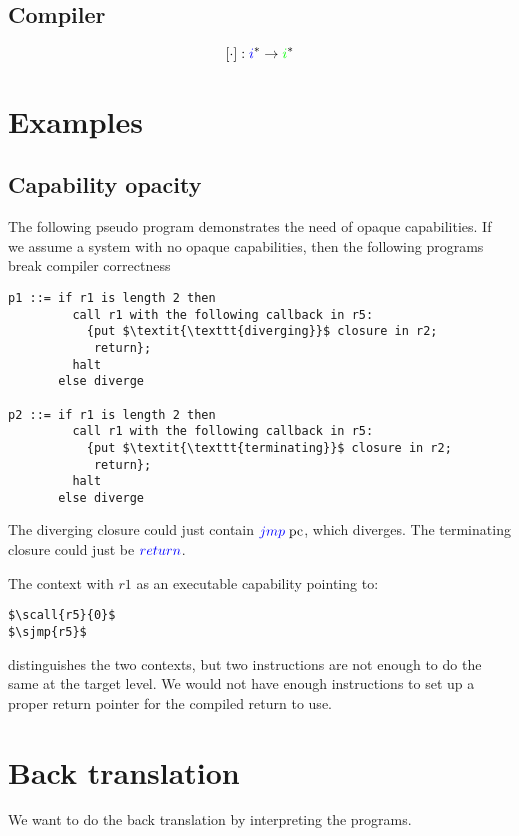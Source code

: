 \documentclass[a4paper]{article}
\newcommand{\fun}{\rightarrow}
\newcommand{\sourcecolor}[1]{\color{blue}}
\newcommand{\src}[1]{{\sourcecolor{} #1}}
\newcommand{\targetcolor}[1]{\color{green}}
\newcommand{\trg}[1]{{\targetcolor{} #1}}
\newcommand{\zinstr}[1]{#1}
\newcommand{\oneinstr}[2]{
  \ifthenelse{\equal{#2}{}}
  {\zinstr{#1}}
  {\zinstr{#1} \; #2}
}
\newcommand{\twoinstr}[3]{
  \ifthenelse{\equal{#2#3}{}}
  {\zinstr{#1}}
  {\zinstr{#1} \; #2 \; #3}
}
\newcommand{\sreturn}{\zinstr{\src{return}}}
\newcommand{\sjmp}[1]{\oneinstr{\src{jmp}}{#1}}
\newcommand{\scall}[2]{\twoinstr{\src{call}}{#1}{#2}}
\newcommand{\pcreg}{\mathrm{pc}}
\newcommand{\comp}[1]{[#1]}
\begin{document}
\subsection{Compiler}
\[
\comp{\cdot} : \src{i}^* \fun \trg{i}^*
\]
\clearpage
\section{Examples}
\subsection{Capability opacity}
The following pseudo program demonstrates the need of opaque capabilities. If we assume a system with no opaque capabilities, then the following programs break compiler correctness
\begin{lstlisting}[basicstyle=\sourcecolor{}\ttfamily] 
p1 ::= if r1 is length 2 then
         call r1 with the following callback in r5:
           {put $\textit{\texttt{diverging}}$ closure in r2;
            return};
         halt
       else diverge

p2 ::= if r1 is length 2 then
         call r1 with the following callback in r5:
           {put $\textit{\texttt{terminating}}$ closure in r2;
            return};
         halt
       else diverge
\end{lstlisting}
The diverging closure could just contain $\sjmp{\pcreg}$, which diverges. The terminating closure could just be $\sreturn$.

The context with $r1$ as an executable capability pointing to:
\begin{lstlisting}
$\scall{r5}{0}$
$\sjmp{r5}$
\end{lstlisting}
distinguishes the two contexts, but two instructions are not enough to do the same at the target level. We would not have enough instructions to set up a proper return pointer for the compiled return to use.

\clearpage
\section{Back translation}
We want to do the back translation by interpreting the programs.
\end{document}
